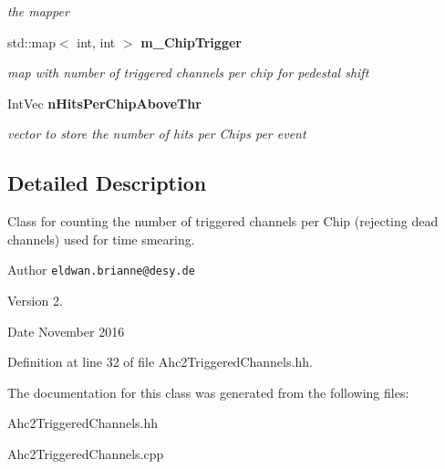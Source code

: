 \begin{DoxyCompactItemize}
\begin{DoxyCompactList}\small\item\em the mapper \end{DoxyCompactList}\item 
std\-::map$<$ int, int $>$ {\bf m\-\_\-\-Chip\-Trigger}\label{classCALICE_1_1Ahc2TriggeredChannels_a5f84dbcf33ef3f3ffb49b0877e6c7e42}

\begin{DoxyCompactList}\small\item\em map with number of triggered channels per chip for pedestal shift \end{DoxyCompactList}\item 
Int\-Vec {\bf n\-Hits\-Per\-Chip\-Above\-Thr}\label{classCALICE_1_1Ahc2TriggeredChannels_a417a5839a46ab815251b3cea17efb0a0}

\begin{DoxyCompactList}\small\item\em vector to store the number of hits per Chips per event \end{DoxyCompactList}\end{DoxyCompactItemize}


\subsection{Detailed Description}
Class for counting the number of triggered channels per Chip (rejecting dead channels) used for time smearing. 

\begin{DoxyAuthor}{Author}
{\tt eldwan.\-brianne@desy.\-de} 
\end{DoxyAuthor}
\begin{DoxyVersion}{Version}
2. 
\end{DoxyVersion}
\begin{DoxyDate}{Date}
November 2016 
\end{DoxyDate}


Definition at line 32 of file Ahc2\-Triggered\-Channels.\-hh.



The documentation for this class was generated from the following files\-:\begin{DoxyCompactItemize}
\item 
Ahc2\-Triggered\-Channels.\-hh\item 
Ahc2\-Triggered\-Channels.\-cpp\end{DoxyCompactItemize}

